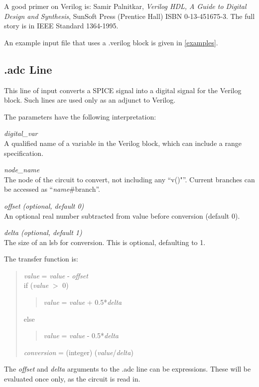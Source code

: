 A good primer on Verilog is:  Samir Palnitkar, {\it Verilog HDL, A
Guide to Digital Design and Synthesis}, SunSoft Press (Prentice Hall)
ISBN 0-13-451675-3.  The full story is in IEEE Standard 1364-1995.

An example input file that uses a {\vt .verilog} block is given
in \ref{examples}.

\subsection{{\vt .adc} Line}
This line of {\WRspice} input converts a SPICE signal into a digital
signal for the Verilog block.  Such lines are used only as an adjunct
to Verilog.


The parameters have the following interpretation:

\begin{description}
\item{\it digital\_var}\\
A qualified name of a variable in the Verilog block, which
can include a range specification.
\item{\it node\_name}\\
The node of the circuit to convert, not including any ``{\vt v()"}''.
Current branches can be accessed as ``{\it name\/}{\vt \#branch}''.
\item{\it offset {\rm (optional, default 0)}}\\
An optional real number subtracted from value before conversion (default 0).
\item{\it delta {\rm (optional, default 1)}}\\
The size of an lsb for conversion.  This is optional, defaulting to 1.
\end{description}

The transfer function is:
\begin{quote}\vt
    {\it value} = {\it value} - {\it offset}\\
    if ({\it value} $>$ 0)
    \begin{quote}
        {\it value} = {\it value} + 0.5*{\it delta}\\
    \end{quote}
    else
    \begin{quote}
        {\it value} = {\it value} - 0.5*{\it delta}\\
    \end{quote}
    {\it conversion} = (integer) ({\it value\/}/{\it delta\/})
\end{quote}

The {\it offset} and {\it delta} arguments to the {\vt .adc} line can
be expressions.  These will be evaluated once only, as the circuit is
read in.




